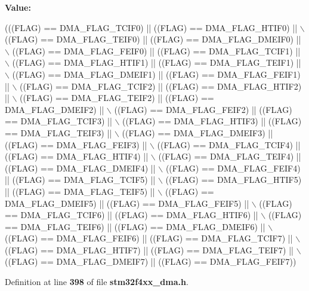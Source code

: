 {\bfseries Value\+:}
\begin{DoxyCode}
(((FLAG) == DMA_FLAG_TCIF0)  || ((FLAG) == DMA_FLAG_HTIF0)  || \(\backslash\)
                               ((FLAG) == DMA_FLAG_TEIF0)  || ((FLAG) == 
      DMA_FLAG_DMEIF0) || \(\backslash\)
                               ((FLAG) == DMA_FLAG_FEIF0)  || ((FLAG) == 
      DMA_FLAG_TCIF1)  || \(\backslash\)
                               ((FLAG) == DMA_FLAG_HTIF1)  || ((FLAG) == 
      DMA_FLAG_TEIF1)  || \(\backslash\)
                               ((FLAG) == DMA_FLAG_DMEIF1) || ((FLAG) == 
      DMA_FLAG_FEIF1)  || \(\backslash\)
                               ((FLAG) == DMA_FLAG_TCIF2)  || ((FLAG) == 
      DMA_FLAG_HTIF2)  || \(\backslash\)
                               ((FLAG) == DMA_FLAG_TEIF2)  || ((FLAG) == 
      DMA_FLAG_DMEIF2) || \(\backslash\)
                               ((FLAG) == DMA_FLAG_FEIF2)  || ((FLAG) == 
      DMA_FLAG_TCIF3)  || \(\backslash\)
                               ((FLAG) == DMA_FLAG_HTIF3)  || ((FLAG) == 
      DMA_FLAG_TEIF3)  || \(\backslash\)
                               ((FLAG) == DMA_FLAG_DMEIF3) || ((FLAG) == 
      DMA_FLAG_FEIF3)  || \(\backslash\)
                               ((FLAG) == DMA_FLAG_TCIF4)  || ((FLAG) == 
      DMA_FLAG_HTIF4)  || \(\backslash\)
                               ((FLAG) == DMA_FLAG_TEIF4)  || ((FLAG) == 
      DMA_FLAG_DMEIF4) || \(\backslash\)
                               ((FLAG) == DMA_FLAG_FEIF4)  || ((FLAG) == 
      DMA_FLAG_TCIF5)  || \(\backslash\)
                               ((FLAG) == DMA_FLAG_HTIF5)  || ((FLAG) == 
      DMA_FLAG_TEIF5)  || \(\backslash\)
                               ((FLAG) == DMA_FLAG_DMEIF5) || ((FLAG) == 
      DMA_FLAG_FEIF5)  || \(\backslash\)
                               ((FLAG) == DMA_FLAG_TCIF6)  || ((FLAG) == 
      DMA_FLAG_HTIF6)  || \(\backslash\)
                               ((FLAG) == DMA_FLAG_TEIF6)  || ((FLAG) == 
      DMA_FLAG_DMEIF6) || \(\backslash\)
                               ((FLAG) == DMA_FLAG_FEIF6)  || ((FLAG) == 
      DMA_FLAG_TCIF7)  || \(\backslash\)
                               ((FLAG) == DMA_FLAG_HTIF7)  || ((FLAG) == 
      DMA_FLAG_TEIF7)  || \(\backslash\)
                               ((FLAG) == DMA_FLAG_DMEIF7) || ((FLAG) == 
      DMA_FLAG_FEIF7))
\end{DoxyCode}


Definition at line \textbf{ 398} of file \textbf{ stm32f4xx\+\_\+dma.\+h}.

